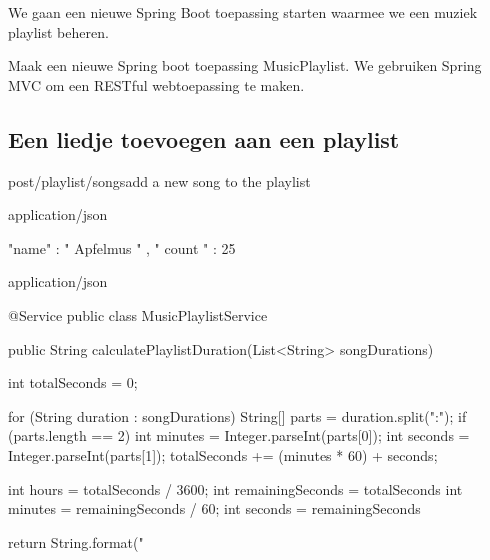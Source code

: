 We gaan een nieuwe Spring Boot toepassing starten waarmee we een muziek playlist beheren. 

\begin{oefening}
Maak een nieuwe Spring boot toepassing MusicPlaylist. We gebruiken Spring MVC om een RESTful webtoepassing te maken.  
\end{oefening}

\subsection{Een liedje toevoegen aan een playlist}

\begin{apiRoute}{post}{/playlist/songs}{add a new song to the playlist}
\begin{routeParameter}
\end{routeParameter}
\begin{routeRequest}{application/json}
\begin{routeRequestBody}
{
"name" : " Apfelmus " ,
" count " : 25
}
\end{routeRequestBody}
\end{routeRequest}
\begin{routeResponse}{application/json}
\end{routeResponse}
\end{apiRoute}


@Service
public class MusicPlaylistService {

    public String calculatePlaylistDuration(List<String> songDurations) {
        int totalSeconds = 0;

        for (String duration : songDurations) {
            String[] parts = duration.split(":");
            if (parts.length == 2) {
                int minutes = Integer.parseInt(parts[0]);
                int seconds = Integer.parseInt(parts[1]);
                totalSeconds += (minutes * 60) + seconds;
            }
        }

        int hours = totalSeconds / 3600;
        int remainingSeconds = totalSeconds %
        int minutes = remainingSeconds / 60;
        int seconds = remainingSeconds %

        return String.format("%
    }
}


